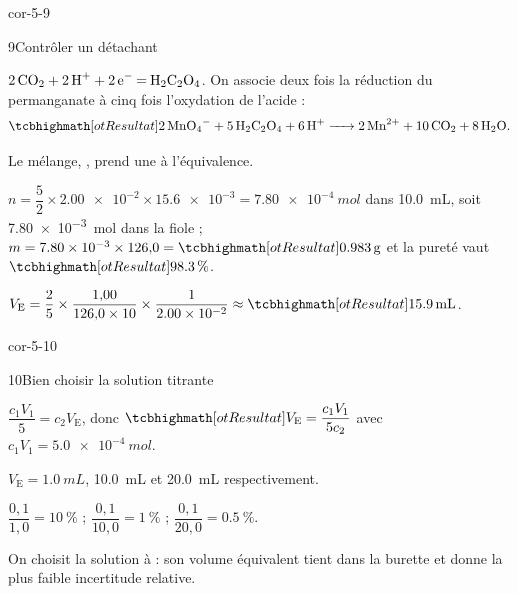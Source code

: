 \begin{blocLivre}{cor-5-9}
\begin{corrige}{9}{Contrôler un détachant}
\begin{questions}
\item $\ce{2CO2 + 2H+ + 2e- = H2C2O4}$. On associe deux fois la réduction du permanganate à cinq fois l'oxydation de l'acide :
\[\res{\ce{2MnO4- + 5H2C2O4 + 6H+ -> 2Mn^{2+} + 10CO2 + 8H2O}}.\]
\item Le mélange, , prend une  à l'équivalence.
\item $n=\dfrac{5}{2}\times\num{2.00e-2}\times\num{15.6e-3}=\qty{7,80e-4}{mol}$ dans \qty{10,0}{mL}, soit \qty{7,80e-3}{mol} dans la fiole ;
$m=\num{7.80e-3}\times126{,}0=\res{\qty{0,983}{g}}$ et la pureté vaut $\res{\qty{98,3}{\percent}}$.
\item $V_\mathrm{E}=\dfrac{2}{5}\times\dfrac{1{,}00}{126{,}0\times10}\times\dfrac{1}{\num{2.00e-2}}\approx\res{\qty{15,9}{mL}}$.
\end{questions}
\end{corrige}
\end{blocLivre}
\begin{blocLivre}{cor-5-10}
\begin{corrige}{10}{Bien choisir la solution titrante}
\begin{questions}
\item $\dfrac{c_1V_1}{5}=c_2V_\mathrm{E}$, donc $\res{V_\mathrm{E}=\dfrac{c_1V_1}{5c_2}}$ avec $c_1V_1=\qty{5,0e-4}{mol}$.
\item $V_\mathrm{E}=\qty{1,0}{mL}$, \qty{10,0}{mL} et \qty{20,0}{mL} respectivement.
\item $\dfrac{0{,}1}{1{,}0}=\qty{10}{\percent}$ ; $\dfrac{0{,}1}{10{,}0}=\qty{1}{\percent}$ ; $\dfrac{0{,}1}{20{,}0}=\qty{0,5}{\percent}$.
\item On choisit la solution à  : son volume équivalent tient dans la burette et donne la plus faible
incertitude relative.
\end{questions}
\end{corrige}
\end{blocLivre}
